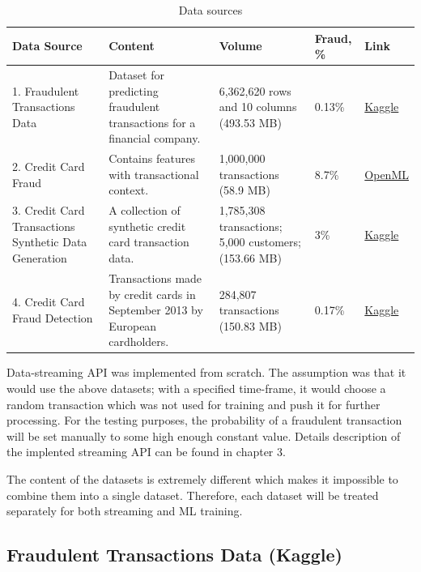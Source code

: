 \documentclass[12pt,a4paper, hidelinks]{article}
\begin{document}
\begin{table}[h!]
\centering


\begin{tabular}{|p{4.8cm}|p{3.5cm}|p{2cm}|p{2cm}|p{1.5cm}|}
\hline
\textbf{Data Source} & \textbf{Content} & \textbf{Volume} &  \textbf{Fraud, \%} & \textbf{Link} \\
\hline
1. Fraudulent Transactions Data &  Dataset for predicting fraudulent transactions for a financial company. &  6,362,620 rows and 10 columns (493.53 MB) & 0.13\% & \href{https://www.kaggle.com/datasets/chitwanmanchanda/fraudulent-transactions-data}{Kaggle} \\
\hline
2. Credit Card Fraud & Contains features with transactional context. & 1,000,000 transactions (58.9 MB) & 8.7\% & \href{https://www.openml.org/search?type=data\&status=active\&id=45955}{OpenML} \\
\hline
3. Credit Card Transactions Synthetic Data Generation & A collection of synthetic credit card transaction data. & 1,785,308 transactions; 5,000 customers; (153.66 MB) & 3\% & \href{https://www.kaggle.com/datasets/cgrodrigues/credit-card-transactions-synthetic-data-generation?select=transactions_df.csv}{Kaggle} \\
\hline
4. Credit Card Fraud Detection & Transactions made by credit cards in September 2013 by European cardholders. & 284,807 transactions (150.83 MB) & 0.17\% & \href{https://www.kaggle.com/datasets/mlg-ulb/creditcardfraud}{Kaggle} \\
\hline
\end{tabular}

\caption{Data sources}
\end{table}

Data-streaming API was implemented from scratch. The assumption was that it would use the above datasets; with a specified time-frame, it would choose a random transaction which was not used for training and push it for further processing. For the testing purposes, the probability of a fraudulent transaction will be set manually to some high enough constant value. Details description of the implented streaming API can be found in chapter 3.

The content of the datasets is extremely different which makes it impossible to combine them into a single dataset. Therefore, each dataset will be treated separately for both streaming and ML training.


\subsection{Fraudulent Transactions Data (Kaggle)}
\end{document}
